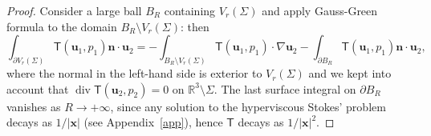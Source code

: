 \documentclass[final]{amsart}
\theoremstyle{definition}
\theoremstyle{definition}
\theoremstyle{remark}
\begin{document}
\begin{proof}
  Consider a large ball $B_R$ containing $V_r({\Sigma})$ and apply
  Gauss-Green formula to the domain $B_R\setminus V_r({\Sigma})$: then
\[
\int_{\partial V_r({\Sigma})}{\mathsf T}({\boldsymbol u}_1,p_1){\boldsymbol n}\cdot{\boldsymbol u}_2 = 
-\int_{B_R\setminus V_r({\Sigma})}{\mathsf T}({\boldsymbol u}_1,p_1)\cdot\nabla{\boldsymbol u}_2-
  \int_{\partial B_R}{\mathsf T}({\boldsymbol u}_1,p_1){\boldsymbol n}\cdot {\boldsymbol u}_2,
\]
where the normal in the left-hand side is exterior to $V_r({\Sigma})$ and
we kept into account that ${\operatorname{\mathrm{div}}}{\mathsf T}({\boldsymbol u}_2,p_2)=0$ on ${\mathbb R}^3\setminus
{\Sigma}$. The last surface integral on $\partial B_R$ vanishes as
$R\to+\infty$, since any solution to the hyperviscous Stokes' problem
decays as $1/|{\boldsymbol x}|$ (see Appendix~\ref{app}), hence ${\mathsf T}$ decays
as $1/|{\boldsymbol x}|^2$.


\end{proof}
\end{document}
